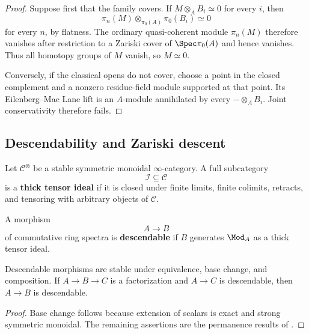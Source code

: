 \begin{proof}
Suppose first that the family covers. If $M\otimes_AB_i\simeq0$ for every
$i$, then
\[
    \pi_n(M)
    \otimes_{\pi_0(A)}
    \pi_0(B_i)
    \simeq
    0
\]
for every $n$, by flatness. The ordinary quasi-coherent module
$\pi_n(M)$ therefore vanishes after restriction to a Zariski cover of
$\Spec\pi_0(A)$ and hence vanishes. Thus all homotopy groups of $M$ vanish,
so $M\simeq0$.

Conversely, if the classical opens do not cover, choose a point in the
closed complement and a nonzero residue-field module supported at that
point. Its Eilenberg--Mac Lane lift is an $A$-module annihilated by every
$-\otimes_AB_i$. Joint conservativity therefore fails.
\end{proof}

\subsection{Descendability and Zariski descent}

\begin{definition}
\label{def:spectral-thick-tensor-ideal}
Let $\mathcal C^\otimes$ be a stable symmetric monoidal
$\infty$-category. A full subcategory
\[
    \mathcal I
    \subseteq
    \mathcal C
\]
is a \textbf{thick tensor ideal} if it is closed under finite limits,
finite colimits, retracts, and tensoring with arbitrary objects of
$\mathcal C$.
\end{definition}

\begin{definition}
\label{def:spectral-descendable-morphism}
A morphism
\[
    A
    \longrightarrow
    B
\]
of commutative ring spectra is \textbf{descendable} if $B$ generates
$\Mod_A$ as a thick tensor ideal.
\end{definition}

\begin{proposition}
\label{prop:spectral-descendability-permanence}
Descendable morphisms are stable under equivalence, base change, and
composition. If $A\to B\to C$ is a factorization and $A\to C$ is
descendable, then $A\to B$ is descendable.
\end{proposition}

\begin{proof}
Base change follows because extension of scalars is exact and strong
symmetric monoidal. The remaining assertions are the permanence results of
\cite[Proposition~3.24]{MathewGaloisStableHomotopy}.
\end{proof}

